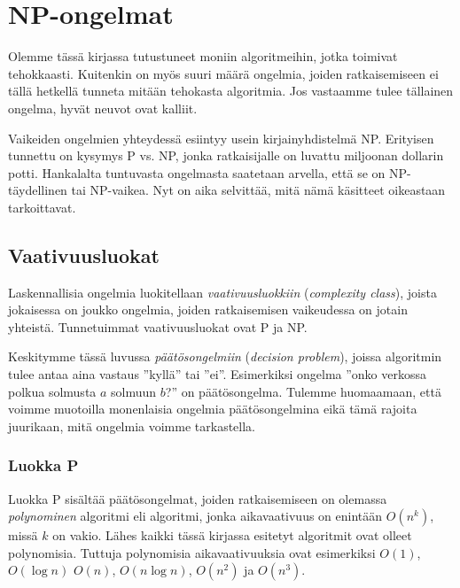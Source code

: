 \chapter{NP-ongelmat}


Olemme tässä kirjassa tutustuneet moniin algoritmeihin,
jotka toimivat tehokkaasti.
Kuitenkin on myös suuri määrä ongelmia, joiden ratkaisemiseen ei tällä
hetkellä tunneta mitään tehokasta algoritmia.
Jos vastaamme tulee tällainen ongelma, hyvät neuvot ovat kalliit.

Vaikeiden ongelmien yhteydessä esiintyy usein kirjainyhdistelmä NP.
Erityisen tunnettu on kysymys P vs. NP,
jonka ratkaisijalle on luvattu miljoonan dollarin potti.
Hankalalta tuntuvasta ongelmasta saatetaan arvella, että
se on NP-täydellinen tai NP-vaikea.
Nyt on aika selvittää, mitä nämä käsitteet oikeastaan tarkoittavat.

\section{Vaativuusluokat}


Laskennallisia ongelmia luokitellaan \emph{vaativuusluokkiin}
(\emph{complexity class}),
joista jokaisessa on joukko ongelmia,
joiden ratkaisemisen vaikeudessa on jotain yhteistä.
Tunnetuimmat vaativuusluokat ovat P ja NP.


Keskitymme tässä luvussa \emph{päätösongelmiin}
(\emph{decision problem}), joissa algoritmin tulee
antaa aina vastaus ''kyllä'' tai ''ei''.
Esimerkiksi ongelma 
''onko verkossa polkua solmusta $a$ solmuun $b$?'' on päätösongelma.
Tulemme huomaamaan, että voimme muotoilla monenlaisia ongelmia
päätösongelmina eikä tämä rajoita juurikaan, mitä ongelmia voimme tarkastella.

\subsection{Luokka P}


Luokka P sisältää päätösongelmat, joiden ratkaisemiseen on
olemassa \emph{polynominen} algoritmi eli algoritmi, jonka aikavaativuus
on enintään $O(n^k)$, missä $k$ on vakio.
Lähes kaikki tässä kirjassa esitetyt algoritmit
ovat olleet polynomisia.
Tuttuja polynomisia aikavaativuuksia ovat esimerkiksi
$O(1)$, $O(\log n)$ $O(n)$, $O(n \log n)$, $O(n^2)$ ja $O(n^3)$.

